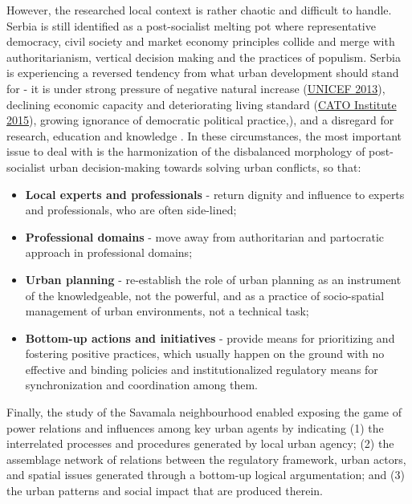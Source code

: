 \documentclass[11pt]{report}
\begin{document}
{{{However, the researched local context is rather chaotic and difficult to handle.
Serbia is still identified as a post-socialist melting pot where representative democracy, civil society and market economy principles collide and merge with authoritarianism, vertical decision making and the practices of populism.
Serbia is experiencing a reversed tendency from what urban development should stand for - it is under strong pressure of negative natural increase (\href{ref}{UNICEF 2013}), declining economic capacity and deteriorating living standard (\href{ref}{CATO Institute 2015}), growing ignorance of democratic political practice,{\citealt{peric_evolution_2016}}), and a disregard for research, education and  knowledge \href{ref}{\citealt{vujosevic_conundrum_2012}}.
In these circumstances, the most important issue to deal with is the harmonization of the disbalanced morphology of post-socialist urban decision-making towards solving urban conflicts, so that:

\begin{itemize}
\item \textbf{Local experts and professionals} - return dignity and influence to experts and professionals, who are often side-lined;

\item \textbf{Professional domains} - move away from authoritarian and partocratic approach in professional domains;

\item \textbf{Urban planning} - re-establish the role of urban planning as an instrument of the knowledgeable, not the powerful, and as a practice of socio-spatial management of urban environments, not a technical task;

\item \textbf{Bottom-up actions and initiatives}  - provide means for prioritizing and fostering positive practices, which usually happen on the ground with no effective and binding policies and institutionalized regulatory means for synchronization and coordination among them.
\end{itemize}

Finally, the study of the Savamala neighbourhood enabled exposing the game of power relations and influences among key urban agents by indicating (1) the interrelated processes and procedures generated by local urban agency;
(2) the	assemblage network of relations between the regulatory framework, urban actors,  and spatial issues generated through a bottom-up logical argumentation;
and
(3)	the urban  patterns  and  social  impact that are produced therein.  
\\

}}}
\end{document}
